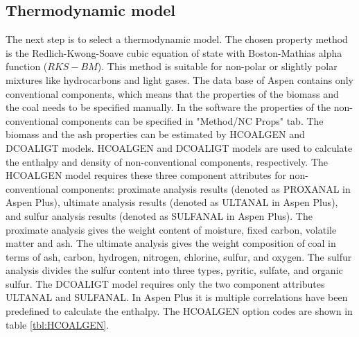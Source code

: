 \subsection{Thermodynamic model} \label{CH:GasifierThermodynamics}
The next step is to select a thermodynamic model. The chosen property method is the Redlich-Kwong-Soave cubic equation of state with Boston-Mathias alpha function ($RKS-BM$). This method is suitable for non-polar or slightly polar mixtures like hydrocarbons and light gases. The data base of Aspen contains only conventional components, which means that the properties of the biomass and the coal needs to be specified manually. In the software the properties of the non-conventional components can be specified in "Method/NC Props" tab. The biomass and the ash properties can be estimated by HCOALGEN and DCOALIGT models. HCOALGEN and DCOALIGT models are used to calculate the enthalpy and density of non-conventional components, respectively. The HCOALGEN model requires these three component attributes for non-conventional components: proximate analysis results (denoted as PROXANAL in Aspen Plus), ultimate analysis results (denoted as ULTANAL in Aspen Plus), and sulfur analysis results (denoted as SULFANAL in Aspen Plus). The proximate analysis gives the weight content of moisture, fixed carbon, volatile matter and ash. The ultimate analysis gives the weight composition of coal in terms of ash, carbon, hydrogen, nitrogen, chlorine, sulfur, and oxygen. The sulfur analysis divides the sulfur content into three types, pyritic, sulfate, and organic sulfur. The DCOALIGT model requires only the two component attributes ULTANAL and SULFANAL. In Aspen Plus it is multiple correlations have been predefined to calculate the enthalpy. The HCOALGEN option codes are shown in table \ref{tbl:HCOALGEN}. 

